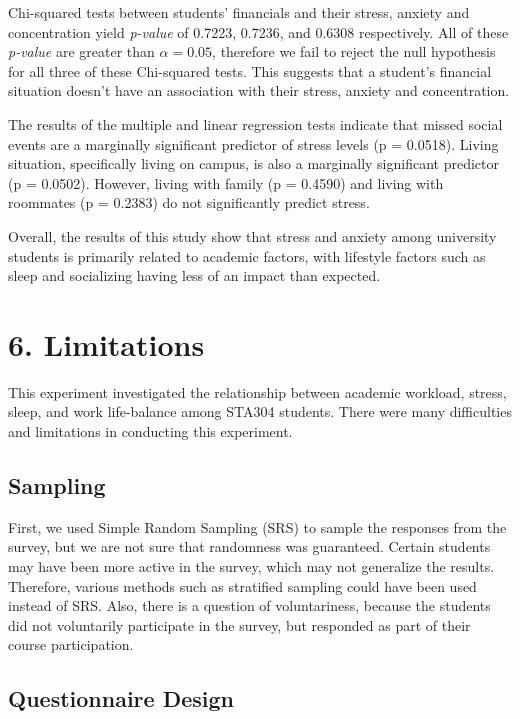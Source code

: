 \documentclass[
  letterpaper,
  DIV=11,
  numbers=noendperiod]{scrartcl}
\begin{document}
Chi-squared tests between students' financials and their stress, anxiety
and concentration yield \emph{p-value} of 0.7223, 0.7236, and 0.6308
respectively. All of these \emph{p-value} are greater than
\(\alpha=0.05\), therefore we fail to reject the null hypothesis for all
three of these Chi-squared tests. This suggests that a student's
financial situation doesn't have an association with their stress,
anxiety and concentration.

The results of the multiple and linear regression tests indicate that
missed social events are a marginally significant predictor of stress
levels (p = 0.0518). Living situation, specifically living on campus, is
also a marginally significant predictor (p = 0.0502). However, living
with family (p = 0.4590) and living with roommates (p = 0.2383) do not
significantly predict stress.

Overall, the results of this study show that stress and anxiety among
university students is primarily related to academic factors, with
lifestyle factors such as sleep and socializing having less of an impact
than expected.

\section{6. Limitations}\label{limitations}

This experiment investigated the relationship between academic workload,
stress, sleep, and work life-balance among STA304 students. There were
many difficulties and limitations in conducting this experiment.

\subsection{Sampling}\label{sampling}

First, we used Simple Random Sampling (SRS) to sample the responses from
the survey, but we are not sure that randomness was guaranteed. Certain
students may have been more active in the survey, which may not
generalize the results. Therefore, various methods such as stratified
sampling could have been used instead of SRS. Also, there is a question
of voluntariness, because the students did not voluntarily participate
in the survey, but responded as part of their course participation.

\subsection{Questionnaire Design}\label{questionnaire-design}
\end{document}
